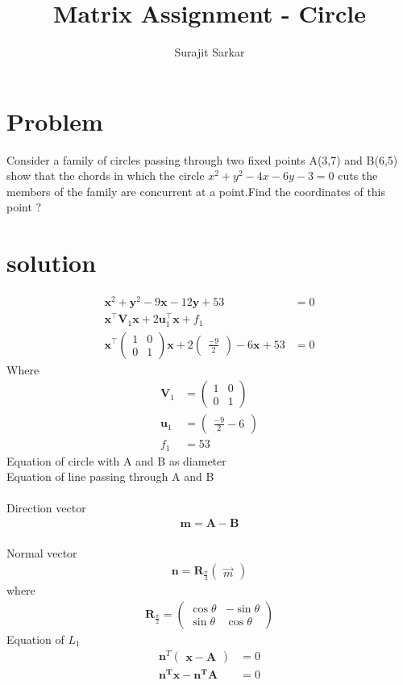 \documentclass[journal,12pt,twocolumn]{IEEEtran}
\title{\mytitle}
\title
{
Matrix Assignment - Circle
}
\author{Surajit Sarkar}
\newcommand{\myvec}[1]{\ensuremath{\begin{pmatrix}#1\end{pmatrix}}}
\let\vec\mathbf
\begin{document}
\maketitle
\tableofcontents
\bigskip


\section{\textbf{Problem}}
Consider a family of circles passing through two fixed points A(3,7) and B(6,5) show that the chords in which the circle $x^2+y^2-4x-6y-3=0$ cuts the members of the family are concurrent at a point.Find the coordinates of this point ?
\section{\textbf{solution}}
\begin{align}
    \vec{x}^2+\vec{y}^2-9\vec{x}-12\vec{y}+53&=0\\
    \vec{x}^{\top}\vec{V}_1\vec{x}+2\vec{u}_1^{\top}\vec{x}+f_1&\\
    \vec{x}^{\top}\myvec{1&0\\0&1}{\vec{x}+2\myvec{\frac{-9}{2}}-6}\vec{x}+ 53&=0
\end{align}
Where
\begin{align}
    \vec{V}_1&={\myvec{1&0\\0&1}}\\
    \vec{u}_1&={\myvec{{\frac{-9}{2}}-6}}\\
    f_1&=53
\end{align}
Equation of circle with A and B as diameter\\
Equation of line passing through A and B
\\ 
\\Direction vector  
  \begin{align}
    \vec{m= A-B}
\end{align}
\\Normal vector
\begin{align}
    \vec{n} = \vec{R}_{\frac{\pi}{2}} \myvec{\Vec{m}}
\end{align}
where
\begin{align}
\vec{R}_{\frac{\pi}{2}} =\myvec{\cos\theta&-\sin\theta\\ \sin\theta&\cos\theta}
\end{align}
Equation of $L_1$
\begin{align}
    \vec{n}^T{\myvec{\vec x-\vec A}}&=0\\
    \vec {n^T x}-\vec {n^TA}&=0
\end{align}
\end{document}
